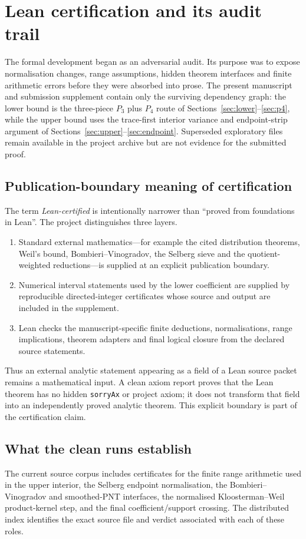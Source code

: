 \documentclass{aomart}
\theoremstyle{definition}
\newcommand{\1}{\mathbf 1}
\begin{document}
\section{Lean certification and its audit trail}\label{sec:lean}

The formal development began as an adversarial audit.  Its purpose was to expose normalisation changes, range assumptions, hidden theorem interfaces and finite arithmetic errors before they were absorbed into prose.  The present manuscript and submission supplement contain only the surviving dependency graph: the lower bound is the three-piece $P_3$ plus $P_4$ route of Sections~\ref{sec:lower}--\ref{sec:p4}, while the upper bound uses the trace-first interior variance and endpoint-strip argument of Sections~\ref{sec:upper}--\ref{sec:endpoint}.  Superseded exploratory files remain available in the project archive but are not evidence for the submitted proof.

\subsection{Publication-boundary meaning of certification}
The term \emph{Lean-certified} is intentionally narrower than ``proved from foundations in Lean''.  The project distinguishes three layers.
\begin{enumerate}[label=(\roman*),leftmargin=*]
\item Standard external mathematics---for example the cited distribution theorems, Weil's bound, Bombieri--Vinogradov, the Selberg sieve and the quotient-weighted reductions---is supplied at an explicit publication boundary.
\item Numerical interval statements used by the lower coefficient are supplied by reproducible directed-integer certificates whose source and output are included in the supplement.
\item Lean checks the manuscript-specific finite deductions, normalisations, range implications, theorem adapters and final logical closure from the declared source statements.
\end{enumerate}
Thus an external analytic statement appearing as a field of a Lean source packet remains a mathematical input.  A clean axiom report proves that the Lean theorem has no hidden \texttt{sorryAx} or project axiom; it does not transform that field into an independently proved analytic theorem.  This explicit boundary is part of the certification claim.

\subsection{What the clean runs establish}
The current source corpus includes certificates for the finite range arithmetic used in the upper interior, the Selberg endpoint normalisation, the Bombieri--Vinogradov and smoothed-PNT interfaces, the normalised Kloosterman--Weil product-kernel step, and the final coefficient/support crossing.  The distributed index identifies the exact source file and verdict associated with each of these roles.
\end{document}
